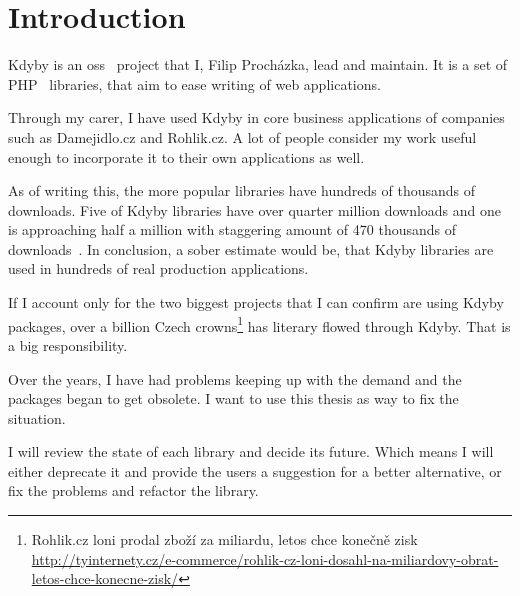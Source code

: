 \chapter{Introduction}

Kdyby is an \gls{oss}~\cite{wiki:oss} project that I, Fi\-li\-p P\-ro\-chá\-z\-ka, lead and maintain. It is a set of PHP~\cite{wiki:php} libraries, that aim to ease writing of web applications.

Through my carer, I have used Kdyby in core business applications of companies such as Damejidlo.cz and Rohlik.cz. A lot of people consider my work useful enough to incorporate it to their own applications as well.

As of writing this, the more popular libraries have hundreds of thousands of downloads. Five of Kdyby libraries have over quarter million downloads and one is approaching half a million with staggering amount of 470 thousands of downloads~\cite{packagist:kdyby}. In conclusion, a sober estimate would be, that Kdyby libraries are used in hundreds of real production applications.

If I account only for the two biggest projects that I can confirm are using Kdyby packages, over a billion Czech crowns\footnote{Rohlik.cz loni prodal zboží za miliardu, letos chce konečně zisk \\\url{http://tyinternety.cz/e-commerce/rohlik-cz-loni-dosahl-na-miliardovy-obrat-letos-chce-konecne-zisk/}} has literary flowed through Kdyby. That is a big responsibility.

Over the years, I have had problems keeping up with the demand and the packages began to get obsolete. I want to use this thesis as way to fix the situation.

I will review the state of each library and decide its future. Which means I will either deprecate it and provide the users a suggestion for a better alternative, or fix the problems and refactor the library.
